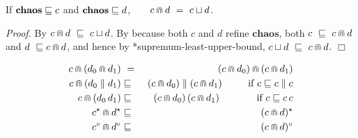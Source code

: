 \documentclass[fleqn]{fac}
\makeatletter
\renewenvironment{proof}{\noindent \textit{Proof.}}{\noindent$\Box$\par}
\def\refaxiom{\@ifnextchar*{\@refaxiom}{\@@refaxiom}}
\def\@refaxiom*#1{\ref{axiom-#1}\index{Axiom!#1|LawUse}}
\def\@@refaxiom#1{axiom~(\ref{axiom-#1})\index{Axiom!#1|LawUse}}
\newcommand{\labelproperty}[1]{\label{property-#1}\index{Property!#1|PropertyDef{\ref{property-#1}}}}
\newcommand{\SSeq}{\,}
\newcommand{\angelic}{\mathbin{\sqcup}}
\newcommand{\together}{\mathbin{\doublecap}}
\newcommand{\Keyword}[1]{\mathsf{\mathbf{#1}}}
\newcommand{\Chaos}{\Keyword{chaos}}
\newcommand{\FinIter}{^{\star}}
\newcommand{\FinOrInfIter}{^{\circ}}
\makeatother
\begin{document}
\begin{lawx}
If $ \Chaos \refsto c$ and $\Chaos \refsto d$,~~~~$c \together d ~=~ c \angelic d$.
\end{lawx}

\begin{proof}
By  $c \together d ~\refsto~ c \angelic d$.
By  because both $c$ and $d$ refine $\Chaos$, 
both $c ~\refsto~ c \together d$ and $d ~\refsto c \together d$,
and hence by \refaxiom{supremum-least-upper-bound}, $c \angelic d ~\refsto~ c \together d$.
\end{proof}



\begin{lawx}
\begin{eqnarray}
  c \together (d_0 \together d_1) & ~=~ & (c \together d_0) \together (c \together d_1)
    \labelproperty{conjunction-distribute-conjunction} \\
  c \together (d_0 \parallel d_1) & \refsto & 
                                                                     (c \together d_0) \parallel (c \together d_1) 
                                                                     \mbox{~~~~~~~~if $c \refsto c \parallel c$} 
    \labelproperty{conjunction-distribute-parallel} \\
  c \together (d_0 \SSeq d_1) & \refsto &
                                                                (c \together d_0) \SSeq (c \together d_1) 
                                                                \mbox{~~~~~~~~~~~\,if $c \refsto c \SSeq c$}
    \labelproperty{conjunction-distribute-sequential} \\
  c\FinIter \together d\FinIter & \refsto &
                                                (c \together d)\FinIter 
    \labelproperty{conjunction-distribute-kleene} \\ 
  c\FinOrInfIter \together d\FinOrInfIter & \refsto &
                                                             (c \together d)\FinOrInfIter 
    \labelproperty{conjunction-distribute-omega} 
\end{eqnarray}
\end{lawx}
\end{document}

